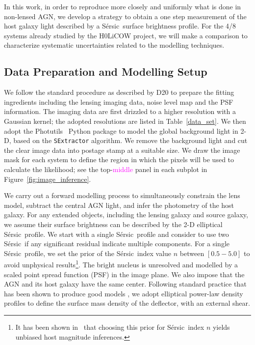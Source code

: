 \documentclass[fleqn,usenatbib]{mnras}
\newcommand{\sersic}{S\'ersic}
\newcommand{\pink}[1]{{\textcolor{magenta}{#1}}}
\begin{document}
In this work, in order to reproduce more closely and uniformly what is
done in non-lensed AGN, we develop a strategy to obtain a one step
measurement of the host galaxy light described by a \sersic\ surface
brightness profile. For the 4/8 systems already studied by the H0LiCOW
project, we will make a comparison to characterize systematic
uncertainties related to the modelling techniques.

\subsection{Data Preparation and Modelling Setup}\label{sec:Modelling}

We follow the standard procedure as described by D20 to prepare the fitting ingredients including the lensing imaging data, noise level map and the PSF information. The imaging data are first drizzled to a higher resolution with a Gaussian kernel; the adopted resolutions are listed in Table~\ref{data_set}. We then adopt the {\sc Photutils}~\citep{photutils} Python package to model the global background light in 2-D, based on the \texttt{SExtractor} algorithm. We remove the background light and cut the clear image data into postage stamp at a suitable size. We draw the image mask for each system to define the region in which the pixels will be used to calculate the likelihood; see the top-\pink{middle} panel in each subplot in Figure~\ref{fig:image_inference}.

We carry out a forward modelling process to simultaneously constrain the lens model, subtract the central AGN light, and infer the photometry of the host galaxy. For any extended objects, including the lensing galaxy and source galaxy, we assume their surface brightness can be described by the 2-D elliptical \sersic\ profile. We start with a single \sersic\ profile and consider to use two \sersic\ if any significant residual indicate multiple components. For a single \sersic\ profile, we set the prior of the \sersic\ index value $n$ between $[0.5-5.0]$ to avoid unphysical results\footnote{It has been shown in~\citet{Ding2017a} that choosing this prior for \sersic\ index $n$ yields unbiased host magnitude inferences.}. The bright nucleus is unresolved and modelled by a scaled point spread function (PSF) in the image plane. We also impose that the AGN and its host galaxy have the same center. Following standard practice that has been shown to produce good models \citep[e.g.,][and references therein]{Treu2010}, we adopt elliptical power-law density profiles to define the surface mass density of the deflector, with an external shear.
\end{document}
